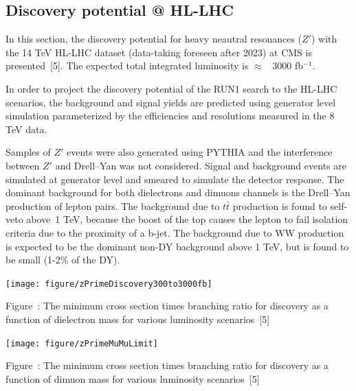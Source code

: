 \documentclass[a0b,portrait,preview]{a0poster}
\begin{document}
\begin{multicols}{3}
{\red \section{\bf Discovery potential @ HL-LHC}}
In this section, the discovery potential for heavy neautral resonances ($Z'$) with the 14 TeV HL-LHC dataset (data-taking foreseen after 2023) at CMS is presented~[5].
The expected total integrated luminosity is $\approx$~ 3000 fb$^{-1}$.

In order to project the discovery potential of the RUN1 search to the HL-LHC scenarios, the background and signal yields are predicted using generator level simulation parameterized 
by the efficiencies and resolutions measured in the 8 TeV data.

Samples of $Z'$ events were also generated using PYTHIA and the interference between $Z'$ and Drell--Yan was not considered.
Signal and background events are simulated at generator level and smeared to simulate the detector response.
The dominant background for both dielectrons and dimuons channels is the Drell--Yan production of lepton pairs. 
The background due to $t\bar{t}$ production is found to self-veto above~1 TeV, because the boost of the top causes the lepton to fail isolation criteria due to the proximity of a b-jet.
The background due to WW production is expected to be the dominant non-DY background above 1 TeV, but is found to be small (1-2\% of the DY).

\begin{minipage}{\figwidth}
\vspace{1.0cm}
\unitlength=1cm
\begin{center}
{\texttt{[image: figure/zPrimeDiscovery300to3000fb]}}%
\newline
\addtocounter{figscount}{1}
{\small \captcolor Figure~: The minimum cross section times branching ratio for discovery as a function of dielectron mass for various luminosity scenarios~[5]}
\end{center}
\label{fig:limit}
\end{minipage}

\begin{minipage}{\figwidth}
\vspace{1.0cm}
\unitlength=1cm
\begin{center}
{\texttt{[image: figure/zPrimeMuMuLimit]}}%
\newline
\addtocounter{figscount}{1}
{\small \captcolor Figure~: The minimum cross section times branching ratio for discovery as a function of dimuon mass for various luminosity scenarios~[5]}
\end{center}
\label{fig:limit}
\vspace{1.5cm}
\end{minipage}


\end{multicols}
\end{document}
